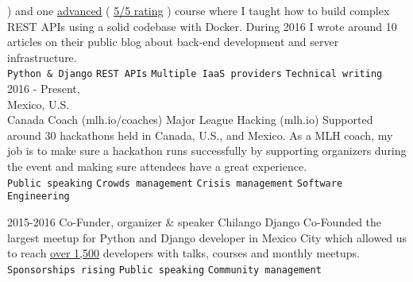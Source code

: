 \documentclass[9pt]{developercv}
\begin{document}
\begin{entrylist}
{{{                )
            }}
            and one
            {\href{https://platzi.com/cursos/django-avanzado/}{\underline{advanced}} (
                \underline{{\href{https://platzi.com/cursos/django-avanzado/opiniones/1/}{5/5 rating}}}
                )
            }
            course where I taught how to build complex REST APIs using a solid codebase with Docker.
            During 2016 I wrote around 10 articles on their public blog about back-end development and
            server infrastructure.\\
                \texttt{Python \& Django}\slashsep
                \texttt{REST APIs}\slashsep
                \texttt{Multiple IaaS providers}\slashsep
                \texttt{Technical writing}
        }
    \entry
        {2016 - Present, \\Mexico, U.S.\\Canada}
        {Coach (mlh.io/coaches)}
        {Major League Hacking (mlh.io)}
        {
            Supported around 30 hackathons held in Canada, U.S., and Mexico. As
            a MLH coach, my job is to make sure a hackathon runs successfully by supporting
            organizers during the event and making sure attendees have a great experience.\\
                \texttt{Public speaking}\slashsep
                \texttt{Crowds management}\slashsep
                \texttt{Crisis management}\slashsep
                \texttt{Software Engineering}
        }
\end{entrylist}


\begin{entrylist}
    \entry
        {2015-2016}
        {Co-Funder, organizer \& speaker}
        {Chilango Django}
        {
            Co-Founded the largest meetup for Python and Django developer in Mexico
            City which allowed us to reach
            {\href{https://meetup.com/Chilango-Django/}{\underline{over 1,500}}}
            developers with talks, courses and monthly meetups.\\
                \texttt{Sponsorships rising}\slashsep
                \texttt{Public speaking}\slashsep
                \texttt{Community management}
        }
\end{entrylist}

\end{document}
